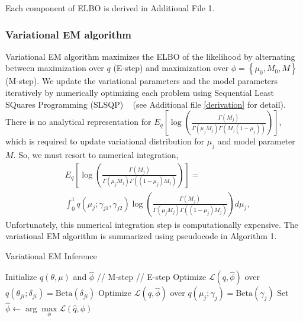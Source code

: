 \documentclass{bmcart}
\begin{document}
Each component of ELBO is derived in Additional File 1.


\subsubsection{Variational EM algorithm}
Variational EM algorithm maximizes the ELBO of the likelihood by alternating between maximization over $q$ (E-step) and maximization over $\phi= \left\{\mu_0, M_0, M \right\}$ (M-step).
We update the variational parameters and the model parameters iteratively by numerically optimizing each problem using Sequential Least SQuares Programming (SLSQP) ~\cite{kraft1988software} (see Additional file \ref{derivation} for detail).
There is no analytical representation for 
$E_q\left[ \log \left( \frac{ \Gamma(M_j) } { \Gamma(\mu_j M_j) \Gamma(M_j (1-\mu_j)) }\right)\right]$,
which is required to update variational distribution for $\mu_j$ and model parameter $M$.
So, we must resort to numerical integration,
\begin{equation}\label{eqn:integration}
\begin{split}
& E_q\left[ \log \left( \frac{ \Gamma(M_j) } { \Gamma(\mu_j M_j) \Gamma((1-\mu_j)M_j ) }\right)\right] =\\
& \int_{0}^{1} q(\mu_j;\gamma_{j1}, \gamma_{j2}) \log \left( \frac{ \Gamma(M_j) } { \Gamma(\mu_j M_j) \Gamma((1-\mu_j)M_j ) }\right) d\mu_j,
\end{split}
\end{equation}
Unfortunately, this numerical integration step is computationally expensive.
The variational EM algorithm is summarized using pseudocode in Algorithm 1.

\begin{algorithm}[ht]
  \caption{Variational EM Inference}
  \begin{algorithmic}[1]
  \State Initialize $q(\theta, \mu)$ and $\hat{\phi}$
  \State // M-step
  \Repeat
    \State // E-step
	\Repeat
			\State Optimize $\mathcal{L}(q, \hat{\phi})$ over $q(\theta_{ji}; \delta_{ji}) = \text{Beta} (\delta_{ji})$
			\EndFor
		\EndFor
            \State Optimize $\mathcal{L}(q, \hat{\phi})$ over $q(\mu_j; \gamma_j) = \text{Beta} (\gamma_j)$
        \EndFor
    \State Set $\hat{\phi} \leftarrow \arg \max\limits_{\phi}
            \mathcal{L}(\hat{q},\phi)$
  \end{algorithmic}
\end{algorithm}
\end{document}

